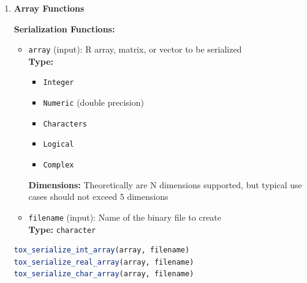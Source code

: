 \documentclass[11pt]{article}
\begin{document}
\begin{enumerate}
\begin{enumerate}
\begin{itemize}
	      	      	\item \texttt{tox\_deserialize\_logical\_array(filename)} -
	      	      	      Deserialize N-dimensional logical array
	      	      	      
	      	      	\item \texttt{tox\_serialize\_complex\_array(array, filename)} -
	      	      	      Serialize N-dimensional complex array
	      	      	      
	      	      	\item \texttt{tox\_deserialize\_complex\_array(filename)} -
	      	      	      Deserialize N-dimensional complex array
	      	      \end{itemize}
	      	      
	      	\item \textbf{Array Functions}
	      	      
	      	      \textbf{Serialization Functions:}
	      	      \begin{itemize}
	      	      	\item \texttt{array} (input): R array, matrix, or vector to be serialized
	      	      	      \\ \textbf{Type:}
	      	      	      \begin{itemize}
	      	      	      	\item \texttt{Integer}
	      	      	      	      
	      	      	      	\item \texttt{Numeric} (double precision)
	      	      	      	      
	      	      	      	\item \texttt{Characters}
	      	      	      	      
	      	      	      	\item \texttt{Logical}
	      	      	      	      
	      	      	      	\item \texttt{Complex}
	      	      	      \end{itemize}
	      	      	      \textbf{Dimensions:} Theoretically are N dimensions supported, but
	      	      	      typical use cases should not exceed 5 dimensions \\
	      	      	      
	      	      	\item \texttt{filename} (input): Name of the binary file to create \\
	      	      	      \textbf{Type:} \texttt{character}
	      	      \end{itemize}
	      	      \begin{lstlisting}[language=R, caption={R Array Serialization Example}]
tox_serialize_int_array(array, filename)
tox_serialize_real_array(array, filename)
tox_serialize_char_array(array, filename)
	      	      \end{lstlisting}
	      	      

\end{enumerate}
\end{enumerate}
\end{document}
